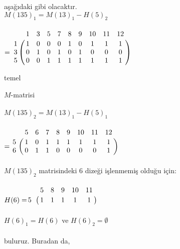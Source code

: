 \documentclass{article}
\begin{document}
aşağıdaki gibi olacaktır. \\

\hspace{3mm}
$M(135)_{1} = M(13)_{1} - H(5)_{2}$ \\
\\

\hspace{17mm}
$ = \bordermatrix{~ & 1 & 3 & 5 & 7 & 8 & 9 & 10 & 11 & 12 \cr
                    1 & 1 & 0 & 0 & 0 & 1 & 0 & 1 & 1 & 1 \cr
                    3 & 0 & 1 & 0 & 1 & 0 & 1 & 0 & 0 & 0 \cr
                    5 & 0 & 0 & 1 & 1 & 1 & 1 & 1 & 1 & 1} $
                    
\hspace{60mm} temel 

\hspace{60mm} $M$-matrisi \\
\\

\hspace{3mm}
$M(135)_{2} = M(13)_{1} - H(5)_{1}$ \\
\\

\hspace{17mm}
$ = \bordermatrix{~ & 5 & 6 & 7 & 8 & 9 & 10 & 11 & 12 \cr
                    5 & 1 & 0 & 1 & 1 & 1 & 1 & 1 & 1 \cr
                    6 & 0 & 1 & 1 & 0 & 0 & 0 & 0 & 1} $ \\
\\ 

\hspace{3mm}
$M(135)_{2}$ matrisindeki $6$ dizeği işlenmemiş olduğu için: \\
\\

\hspace{17mm}
$ H(6) = \bordermatrix {~ & 5 & 8 & 9 & 10 & 11 \cr
                         5 & 1 & 1 & 1 & 1 & 1} $ \\
\\
                         
\hspace{17mm}
$H(6)_{1} = H(6)$   ve   $H(6)_{2} = \emptyset$ \\
\\

buluruz. Buradan da, \\
\\
\end{document}
